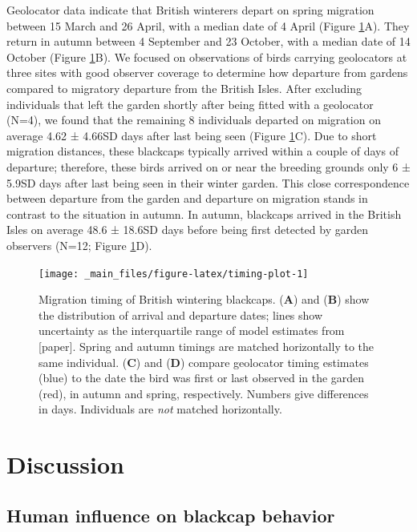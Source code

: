 \documentclass[a4paper, twoside]{templates/ociamthesis}
\begin{document}
Geolocator data indicate that British winterers depart on spring migration between 15 March and 26 April, with a median date of 4 April (Figure \ref{fig:timing-plot}A). They return in autumn between 4 September and 23 October, with a median date of 14 October (Figure \ref{fig:timing-plot}B). We focused on observations of birds carrying geolocators at three sites with good observer coverage to determine how departure from gardens compared to migratory departure from the British Isles. After excluding individuals that left the garden shortly after being fitted with a geolocator (N=4), we found that the remaining 8 individuals departed on migration on average 4.62 ± 4.66SD days after last being seen (Figure \ref{fig:timing-plot}C). Due to short migration distances, these blackcaps typically arrived within a couple of days of departure; therefore, these birds arrived on or near the breeding grounds only 6 ± 5.9SD days after last being seen in their winter garden. This close correspondence between departure from the garden and departure on migration stands in contrast to the situation in autumn. In autumn, blackcaps arrived in the British Isles on average 48.6 ± 18.6SD days before being first detected by garden observers (N=12; Figure \ref{fig:timing-plot}D).



\begin{figure}
\texttt{[image: \_main\_files/figure-latex/timing-plot-1]} \caption{Migration timing of British wintering blackcaps. (\textbf{A}) and (\textbf{B}) show the distribution of arrival and departure dates; lines show uncertainty as the interquartile range of model estimates from {[}paper{]}. Spring and autumn timings are matched horizontally to the same individual. (\textbf{C}) and (\textbf{D}) compare geolocator timing estimates (blue) to the date the bird was first or last observed in the garden (red), in autumn and spring, respectively. Numbers give differences in days. Individuals are \emph{not} matched horizontally.}\label{fig:timing-plot}
\end{figure}

\hypertarget{discussion}{%
\section{Discussion}\label{discussion}}

\hypertarget{human-influence-on-blackcap-behavior}{%
\subsection{Human influence on blackcap behavior}\label{human-influence-on-blackcap-behavior}}
\end{document}
